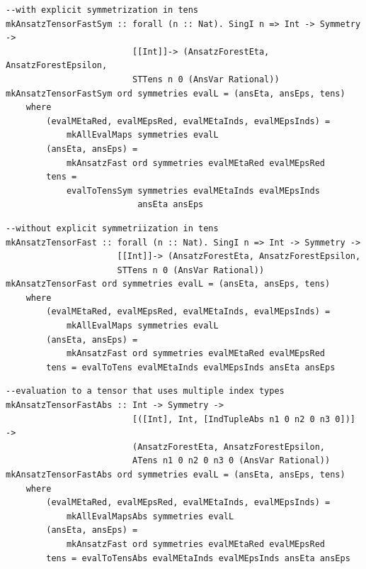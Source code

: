 \documentclass[a4paper,12pt, DIV=14, BCOR=5mm, twoside, headsepline]{scrbook}
\begin{document}
\begin{samepage}
\begin{verbatim}
--with explicit symmetrization in tens
mkAnsatzTensorFastSym :: forall (n :: Nat). SingI n => Int -> Symmetry ->
                         [[Int]]-> (AnsatzForestEta, AnsatzForestEpsilon,
                         STTens n 0 (AnsVar Rational))
mkAnsatzTensorFastSym ord symmetries evalL = (ansEta, ansEps, tens)
    where
        (evalMEtaRed, evalMEpsRed, evalMEtaInds, evalMEpsInds) =
            mkAllEvalMaps symmetries evalL 
        (ansEta, ansEps) =
            mkAnsatzFast ord symmetries evalMEtaRed evalMEpsRed
        tens =
            evalToTensSym symmetries evalMEtaInds evalMEpsInds
                          ansEta ansEps
\end{verbatim} 
\end{samepage}

\begin{samepage}
\begin{verbatim}
--without explicit symmetriization in tens
mkAnsatzTensorFast :: forall (n :: Nat). SingI n => Int -> Symmetry ->
                      [[Int]]-> (AnsatzForestEta, AnsatzForestEpsilon,
                      STTens n 0 (AnsVar Rational))
mkAnsatzTensorFast ord symmetries evalL = (ansEta, ansEps, tens)
    where
        (evalMEtaRed, evalMEpsRed, evalMEtaInds, evalMEpsInds) =
            mkAllEvalMaps symmetries evalL 
        (ansEta, ansEps) =
            mkAnsatzFast ord symmetries evalMEtaRed evalMEpsRed
        tens = evalToTens evalMEtaInds evalMEpsInds ansEta ansEps
\end{verbatim} 
\end{samepage}

\begin{samepage}
\begin{verbatim}
--evaluation to a tensor that uses multiple index types
mkAnsatzTensorFastAbs :: Int -> Symmetry ->
                         [([Int], Int, [IndTupleAbs n1 0 n2 0 n3 0])] ->
                         (AnsatzForestEta, AnsatzForestEpsilon,
                         ATens n1 0 n2 0 n3 0 (AnsVar Rational))
mkAnsatzTensorFastAbs ord symmetries evalL = (ansEta, ansEps, tens)
    where
        (evalMEtaRed, evalMEpsRed, evalMEtaInds, evalMEpsInds) =
            mkAllEvalMapsAbs symmetries evalL 
        (ansEta, ansEps) =
            mkAnsatzFast ord symmetries evalMEtaRed evalMEpsRed
        tens = evalToTensAbs evalMEtaInds evalMEpsInds ansEta ansEps
\end{verbatim} 
\end{samepage}
\end{document}

